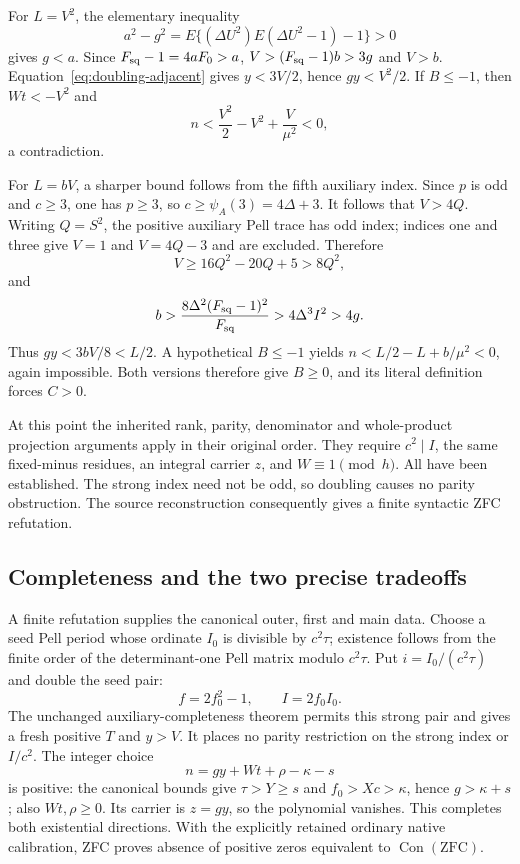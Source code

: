 For $L=V^2$, the elementary inequality
\[
 a^2-g^2
   =E\{(\Delta U^2)E(\Delta U^2-1)-1\}>0
\]
gives $g<a$.  Since $F_{\rm sq}-1=4aF_0>a$,
$V>(F_{\rm sq}-1)b>3g$ and $V>b$.
Equation~\eqref{eq:doubling-adjacent} gives $y<3V/2$, hence
$gy<V^2/2$.  If $B\le-1$, then $Wt<-V^2$ and
\[
 n<\frac{V^2}{2}-V^2+\frac{V}{\mu^2}<0,
\]
a contradiction.

For $L=bV$, a sharper bound follows from the fifth auxiliary index.
Since $p$ is odd and $c\ge3$, one has $p\ge3$, so
$c\ge\psi_A(3)=4\Delta+3$.  It follows that $V>4Q$.
Writing $Q=S^2$, the positive auxiliary Pell trace has odd index;
indices one and three give $V=1$ and $V=4Q-3$ and are excluded.
Therefore
\[
 V\ge16Q^2-20Q+5>8Q^2,
\]
and
\[
 b>\frac{8\Delta^2(F_{\rm sq}-1)^2}{F_{\rm sq}}
   >4\Delta^3I^2>4g.
\]
Thus $gy<3bV/8<L/2$.  A hypothetical $B\le-1$ yields
$n<L/2-L+b/\mu^2<0$, again impossible.  Both versions therefore
give $B\ge0$, and its literal definition forces $C>0$.

At this point the inherited rank, parity, denominator and whole-product
projection arguments apply in their original order.  They require
$c^2\mid I$, the same fixed-minus residues, an integral carrier $z$,
and $W\equiv1\pmod h$.  All have been established.  The strong index
need not be odd, so doubling causes no parity obstruction.  The source
reconstruction consequently gives a finite syntactic ZFC refutation.

\subsection{Completeness and the two precise tradeoffs}

A finite refutation supplies the canonical outer, first and main data.
Choose a seed Pell period whose ordinate $I_0$ is divisible by
$c^2\tau$; existence follows from the finite order of the determinant-one
Pell matrix modulo $c^2\tau$.  Put $i=I_0/(c^2\tau)$ and double the
seed pair:
\[
 f=2f_0^2-1,\qquad I=2f_0I_0.
\]
The unchanged auxiliary-completeness theorem permits this strong pair
and gives a fresh positive $T$ and $y>V$.  It places no parity
restriction on the strong index or $I/c^2$.
The integer choice
\[
 n=gy+Wt+\rho-\kappa-s
\]
is positive: the canonical bounds give $\tau>Y\ge s$ and
$f_0>Xc>\kappa$, hence $g>\kappa+s$; also $Wt,\rho\ge0$.
Its carrier is $z=gy$, so the polynomial vanishes.  This completes
both existential directions.  With the explicitly retained ordinary
native calibration, ZFC proves absence of positive zeros equivalent
to $\operatorname{Con}(\mathrm{ZFC})$.

